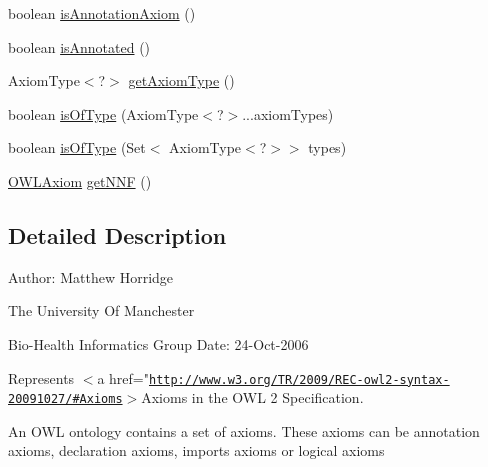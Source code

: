 \begin{DoxyCompactItemize}
\item 
boolean \hyperlink{interfaceorg_1_1semanticweb_1_1owlapi_1_1model_1_1_o_w_l_axiom_ae8057d9c015ebf6e9ddbc54a62e947bb}{is\-Annotation\-Axiom} ()
\item 
boolean \hyperlink{interfaceorg_1_1semanticweb_1_1owlapi_1_1model_1_1_o_w_l_axiom_a366958a8a96578365b38dccb8f960fcb}{is\-Annotated} ()
\item 
Axiom\-Type$<$?$>$ \hyperlink{interfaceorg_1_1semanticweb_1_1owlapi_1_1model_1_1_o_w_l_axiom_a11b8c4eaf727d63cdc38b8cf923e28fc}{get\-Axiom\-Type} ()
\item 
boolean \hyperlink{interfaceorg_1_1semanticweb_1_1owlapi_1_1model_1_1_o_w_l_axiom_afd6a29c46a9f44abc432a1b9e467785d}{is\-Of\-Type} (Axiom\-Type$<$?$>$...axiom\-Types)
\item 
boolean \hyperlink{interfaceorg_1_1semanticweb_1_1owlapi_1_1model_1_1_o_w_l_axiom_afc42861f48a245e7b1082f20c2e293c3}{is\-Of\-Type} (Set$<$ Axiom\-Type$<$?$>$$>$ types)
\item 
\hyperlink{interfaceorg_1_1semanticweb_1_1owlapi_1_1model_1_1_o_w_l_axiom}{O\-W\-L\-Axiom} \hyperlink{interfaceorg_1_1semanticweb_1_1owlapi_1_1model_1_1_o_w_l_axiom_af414f1e9b7b0f0f7b1597421e8d88e30}{get\-N\-N\-F} ()
\end{DoxyCompactItemize}


\subsection{Detailed Description}
Author\-: Matthew Horridge\par
 The University Of Manchester\par
 Bio-\/\-Health Informatics Group Date\-: 24-\/\-Oct-\/2006 

Represents $<$a href="\href{http://www.w3.org/TR/2009/REC-owl2-syntax-20091027/#Axioms}{\tt http\-://www.\-w3.\-org/\-T\-R/2009/\-R\-E\-C-\/owl2-\/syntax-\/20091027/\#\-Axioms}$>$Axioms in the O\-W\-L 2 Specification. 

An O\-W\-L ontology contains a set of axioms. These axioms can be annotation axioms, declaration axioms, imports axioms or logical axioms 

